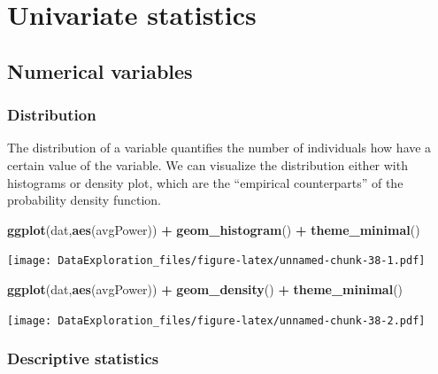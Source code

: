 \documentclass[
]{book}
\newenvironment{Shaded}{\begin{snugshade}}{\end{snugshade}}
\newcommand{\KeywordTok}[1]{\textcolor[rgb]{0.13,0.29,0.53}{\textbf{#1}}}
\newcommand{\NormalTok}[1]{#1}
\newcommand{\OperatorTok}[1]{\textcolor[rgb]{0.81,0.36,0.00}{\textbf{#1}}}
\newcommand{\StringTok}[1]{\textcolor[rgb]{0.31,0.60,0.02}{#1}}
\begin{document}
\hypertarget{univariate-statistics}{%
\section{Univariate statistics}\label{univariate-statistics}}

\hypertarget{numerical-variables}{%
\subsection{Numerical variables}\label{numerical-variables}}

\hypertarget{distribution}{%
\subsubsection{Distribution}\label{distribution}}

The distribution of a variable quantifies the number of individuals how have a certain value of the variable. We can visualize the distribution either with histograms or density plot, which are the ``empirical counterparts'' of the probability density function.

\begin{Shaded}
\begin{Highlighting}[]
\KeywordTok{ggplot}\NormalTok{(dat,}\KeywordTok{aes}\NormalTok{(avgPower)) }\OperatorTok{+}\StringTok{ }\KeywordTok{geom_histogram}\NormalTok{() }\OperatorTok{+}\StringTok{ }\KeywordTok{theme_minimal}\NormalTok{()}
\end{Highlighting}
\end{Shaded}

\texttt{[image: DataExploration\_files/figure-latex/unnamed-chunk-38-1.pdf]}

\begin{Shaded}
\begin{Highlighting}[]
\KeywordTok{ggplot}\NormalTok{(dat,}\KeywordTok{aes}\NormalTok{(avgPower)) }\OperatorTok{+}\StringTok{ }\KeywordTok{geom_density}\NormalTok{() }\OperatorTok{+}\StringTok{ }\KeywordTok{theme_minimal}\NormalTok{()}
\end{Highlighting}
\end{Shaded}

\texttt{[image: DataExploration\_files/figure-latex/unnamed-chunk-38-2.pdf]}

\hypertarget{descriptive-statistics}{%
\subsubsection{Descriptive statistics}\label{descriptive-statistics}}
\end{document}
